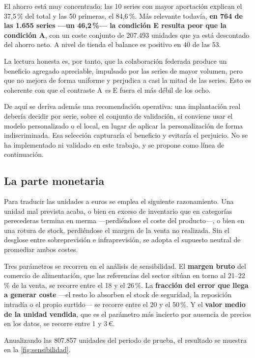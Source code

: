 El ahorro está muy concentrado: las 10 series con mayor aportación explican el 37,5\,\% del total y
las 50 primeras, el 84,6\,\%. Más relevante todavía, \textbf{en 764 de las 1.655 series —un
46,2\,\%— la condición E resulta peor que la condición A}, con un coste conjunto de 207.493 unidades
que ya está descontado del ahorro neto. A nivel de tienda el balance es positivo en 40 de las 53.

La lectura honesta es, por tanto, que la colaboración federada produce un beneficio agregado
apreciable, impulsado por las series de mayor volumen, pero que no mejora de forma uniforme y
perjudica a casi la mitad de las series. Esto es coherente con que el contraste A \emph{vs} E fuera
el más débil de los ocho.

De aquí se deriva además una recomendación operativa: una implantación real debería decidir por
serie, sobre el conjunto de validación, si conviene usar el modelo personalizado o el local, en
lugar de aplicar la personalización de forma indiscriminada. Esa selección capturaría el beneficio
y evitaría el perjuicio. No se ha implementado ni validado en este trabajo, y se propone como
línea de continuación.

\subsection{La parte monetaria}

Para traducir las unidades a euros se emplea el siguiente razonamiento. Una unidad mal prevista
acaba, o bien en exceso de inventario que en categorías perecederas termina en merma —perdiéndose
el coste del producto—, o bien en una rotura de stock, perdiéndose el margen de la venta no
realizada. Sin el desglose entre sobreprevisión e infraprevisión, se adopta el supuesto neutral de
promediar ambos costes.

Tres parámetros se recorren en el análisis de sensibilidad. El \textbf{margen bruto} del comercio de
alimentación, que las referencias del sector sitúan en torno al 21–22\,\% de la venta, se recorre
entre el 18 y el 26\,\%. La \textbf{fracción del error que llega a generar coste} —el resto lo
absorben el stock de seguridad, la reposición intradía o el propio surtido— se recorre entre el 20 y
el 50\,\%. Y el \textbf{valor medio de la unidad vendida}, que es el parámetro más incierto por
ausencia de precios en los datos, se recorre entre 1 y 3\,€.

Anualizando las 807.857 unidades del periodo de prueba, el resultado se muestra en la
\cref{fig:sensibilidad}.

